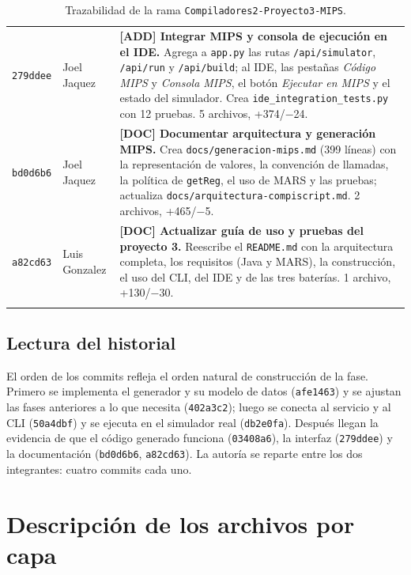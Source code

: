\documentclass[11pt,a4paper]{article}
\begin{document}
\begin{longtable}{@{}p{1.6cm}L{2.7cm}L{9.1cm}@{}}
\texttt{279ddee} & Joel Jaquez &
\textbf{[ADD] Integrar MIPS y consola de ejecución en el IDE.} Agrega a
\texttt{app.py} las rutas \texttt{/api/simulator}, \texttt{/api/run} y
\texttt{/api/build}; al IDE, las pestañas \emph{Código MIPS} y
\emph{Consola MIPS}, el botón \emph{Ejecutar en MIPS} y el estado del
simulador. Crea \texttt{ide\_integration\_tests.py} con 12 pruebas. 5 archivos,
+374/$-$24. \\
\addlinespace

\texttt{bd0d6b6} & Joel Jaquez &
\textbf{[DOC] Documentar arquitectura y generación MIPS.} Crea
\texttt{docs/generacion-mips.md} (399 líneas) con la representación de valores,
la convención de llamadas, la política de \texttt{getReg}, el uso de MARS y las
pruebas; actualiza \texttt{docs/arquitectura-compiscript.md}. 2 archivos,
+465/$-$5. \\
\addlinespace

\texttt{a82cd63} & Luis Gonzalez &
\textbf{[DOC] Actualizar guía de uso y pruebas del proyecto 3.} Reescribe el
\texttt{README.md} con la arquitectura completa, los requisitos (Java y MARS),
la construcción, el uso del CLI, del IDE y de las tres baterías. 1 archivo,
+130/$-$30. \\
\bottomrule
\caption{Trazabilidad de la rama \texttt{Compiladores2-Proyecto3-MIPS}.}
\end{longtable}

\subsection{Lectura del historial}

El orden de los commits refleja el orden natural de construcción de la fase.
Primero se implementa el generador y su modelo de datos (\texttt{afe1463}) y se
ajustan las fases anteriores a lo que necesita (\texttt{402a3c2}); luego se
conecta al servicio y al CLI (\texttt{50a4dbf}) y se ejecuta en el simulador
real (\texttt{db2e0fa}). Después llegan la evidencia de que el código generado
funciona (\texttt{03408a6}), la interfaz (\texttt{279ddee}) y la documentación
(\texttt{bd0d6b6}, \texttt{a82cd63}). La autoría se reparte entre los dos
integrantes: cuatro commits cada uno.

\section{Descripción de los archivos por capa}
\end{document}
